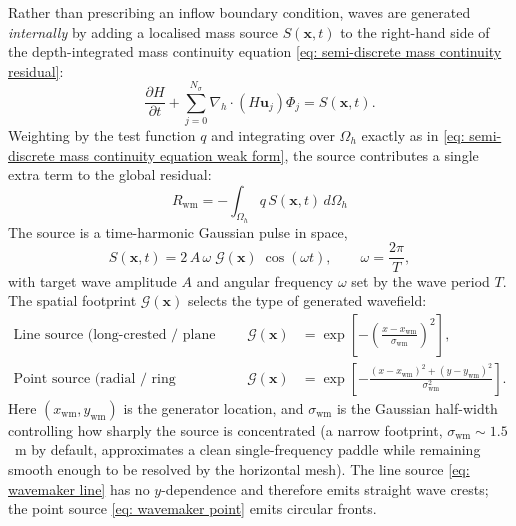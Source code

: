 \documentclass{article}
\newcommand{\Ns}{N_\sigma}
\newcommand{\uj}{\mathbf{u}_j}
\newcommand{\sumj}{\sum_{j=0}^{\Ns}}
\newcommand{\nablah}{\nabla_h}
\newcommand{\ddt}[1]{\frac{\partial #1}{\partial t}}
\newcommand{\Phij}{\Phi_j}
\newcommand{\Oh}{\Omega_h}
\begin{document}
Rather than prescribing an inflow boundary condition, waves are generated \emph{internally} by adding
a localised mass source $S(\mathbf{x},t)$ to the right-hand side of the depth-integrated mass
continuity equation \eqref{eq: semi-discrete mass continuity residual}:
\begin{equation}
    \ddt{H} + \sumj\nablah\cdot\left(H\uj\right)\Phij = S(\mathbf{x},t).
    \label{eq: continuity with source}
\end{equation}
Weighting by the test function $q$ and integrating over $\Oh$ exactly as in
\eqref{eq: semi-discrete mass continuity equation weak form}, the source contributes a single extra
term to the global residual:
\begin{equation}
    \boxed{\; R_{\text{wm}} = -\int_{\Oh} q\, S(\mathbf{x},t)\, d\Oh \;}
    \label{eq: wavemaker residual contribution}
\end{equation}
The source is a time-harmonic Gaussian pulse in space,
\begin{equation}
    S(\mathbf{x},t) = 2\,A\,\omega\; \mathcal{G}(\mathbf{x})\;\cos(\omega t),
    \qquad \omega = \frac{2\pi}{T},
    \label{eq: wavemaker source profile}
\end{equation}
with target wave amplitude $A$ and angular frequency $\omega$ set by the wave period $T$. The spatial
footprint $\mathcal{G}(\mathbf{x})$ selects the type of generated wavefield:
\begin{subequations}\label{eq: wavemaker footprints}
    \begin{align}
        \text{Line source (long-crested / plane waves):} && \mathcal{G}(\mathbf{x}) &= \exp\!\left[-\left(\frac{x-x_{\text{wm}}}{\sigma_{\text{wm}}}\right)^{2}\right], \label{eq: wavemaker line}\\[1mm]
        \text{Point source (radial / ring waves):} && \mathcal{G}(\mathbf{x}) &= \exp\!\left[-\frac{(x-x_{\text{wm}})^{2}+(y-y_{\text{wm}})^{2}}{\sigma_{\text{wm}}^{2}}\right]. \label{eq: wavemaker point}
    \end{align}
\end{subequations}
Here $(x_{\text{wm}}, y_{\text{wm}})$ is the generator location, and $\sigma_{\text{wm}}$ is the
Gaussian half-width controlling how sharply the source is concentrated (a narrow footprint,
$\sigma_{\text{wm}}\sim1.5$~m by default, approximates a clean single-frequency paddle while
remaining smooth enough to be resolved by the horizontal mesh). The line source
\eqref{eq: wavemaker line} has no $y$-dependence and therefore emits straight wave crests; the point
source \eqref{eq: wavemaker point} emits circular fronts.
\end{document}
